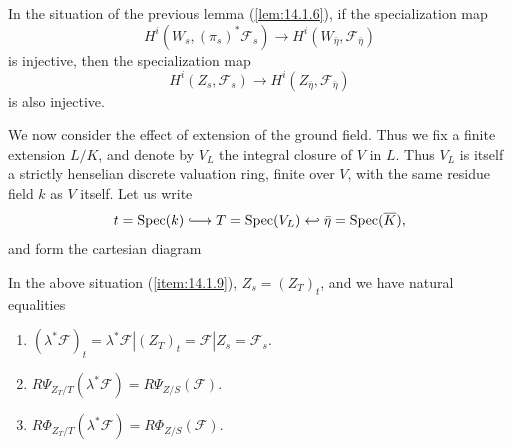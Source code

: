 \begin{kcor}\label{cor:14.1.8}
In the situation of the previous lemma (\ref{lem:14.1.6}), if the specialization map
\[
H^i(W_s, (\pi_s)^*\mathcal{F}_s) \to H^i(W_{\bar{\eta}}, \mathcal{F}_{\bar{\eta}})
\]
is injective, then the specialization map
\[
H^i(Z_s, \mathcal{F}_s) \to H^i(Z_{\bar{\eta}}, \mathcal{F}_{\bar{\eta}})
\]
is also injective.
\end{kcor}

\kmitem\label{item:14.1.9}
We now consider the effect of extension of the ground field. Thus we fix a finite extension $L/K$, and denote by $V_L$ the integral closure of $V$ in $L$. Thus $V_L$ is itself a strictly henselian discrete valuation ring, finite over $V$, with the same residue field $k$ as $V$ itself. Let us write
\[
t = \Spec(k) \mathrel{\lhook\joinrel\longrightarrow} T = \Spec(V_L) \hookleftarrow \bar{\eta} = \Spec(\overline{K}) ,
\]
and form the cartesian diagram
\begin{center}
\end{center}

\begin{klem}\label{lem:14.1.9.1}
In the above situation (\ref{item:14.1.9}), $Z_s = (Z_T)_t$, and we have natural equalities
\begin{enumerate}[label=\arabic*)]
\item $(\lambda^*\mathcal{F})_t = \lambda^*\mathcal{F}|(Z_T)_t = \mathcal{F}|Z_s = \mathcal{F}_s .$
\item $R\Psi_{Z_T/T}(\lambda^*\mathcal{F}) = R\Psi_{Z/S}(\mathcal{F}) .$
\item $R\Phi_{Z_T/T}(\lambda^*\mathcal{F}) = R\Phi_{Z/S}(\mathcal{F}) .$
\end{enumerate}
\end{klem}

